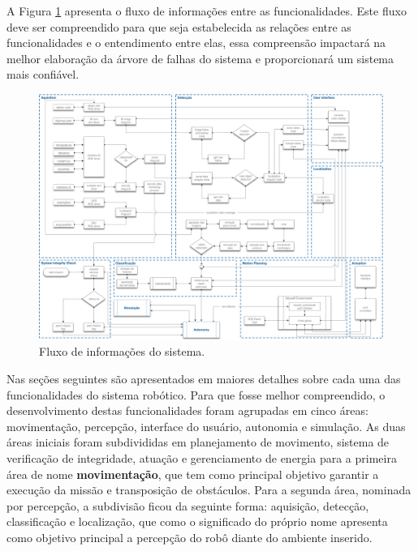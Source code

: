 A Figura \ref{img:elirfluxo} apresenta o fluxo de informações entre as funcionalidades. Este fluxo deve ser compreendido para que seja estabelecida as relações entre as funcionalidades e o entendimento entre elas, essa compreensão impactará na melhor elaboração da árvore de falhas do sistema e proporcionará um sistema mais confiável.

\begin{figure} [h!]	
	\caption{Fluxo de informações do sistema.}
	\label{img:elirfluxo}											 
	\centering													 
	\includegraphics[width=1.0\textwidth]{Figures/flxinfofunctionalities}
\end{figure}													 

Nas seções seguintes são apresentados em maiores detalhes sobre cada uma das funcionalidades do sistema robótico. Para que fosse melhor compreendido, o desenvolvimento destas funcionalidades foram agrupadas em cinco áreas: movimentação, percepção, interface do usuário, autonomia e simulação. As duas áreas iniciais foram subdivididas em planejamento de movimento, sistema de verificação de integridade, atuação e gerenciamento de energia para a primeira área de nome \textbf{movimentação}, que tem como principal objetivo garantir a execução da missão e transposição de obstáculos. Para a segunda área, nominada por percepção, a subdivisão ficou da seguinte forma: aquisição, detecção, classificação e localização, que como o significado do próprio nome apresenta como objetivo principal a percepção do robô diante do ambiente inserido.

